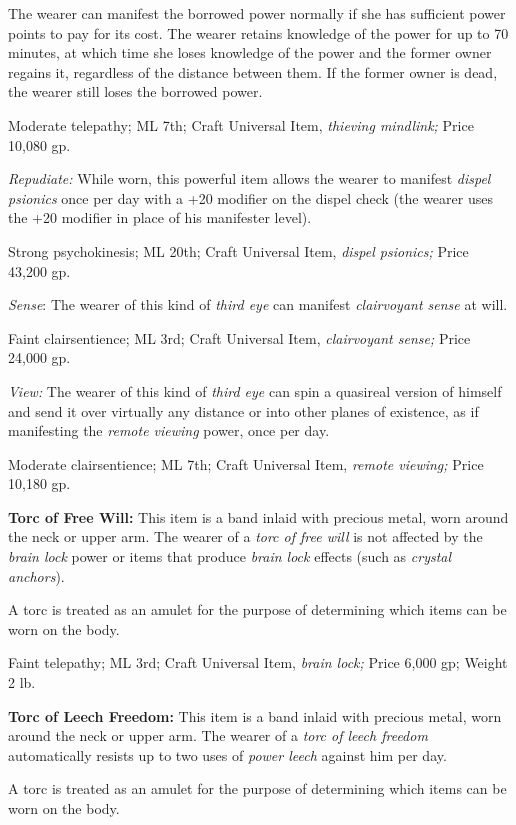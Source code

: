 \documentclass{article}
\begin{document}
The wearer can manifest the borrowed power normally if she has sufficient power 
points to pay for its cost. The wearer retains knowledge of the power for up to 
70 minutes, at which time she loses knowledge of the power and the former owner 
regains it, regardless of the distance between them. If the former owner is dead, 
the wearer still loses the borrowed power.

Moderate telepathy; ML 7th; Craft Universal Item, \textit{thieving mindlink; }Price 
10,080 gp.

\textit{Repudiate: }While worn, this powerful item allows the wearer to manifest 
\textit{dispel psionics }once per day with a +20 modifier on the dispel check (the 
wearer uses the +20 modifier in place of his manifester level).

Strong psychokinesis; ML 20th; Craft Universal Item, \textit{dispel psionics; }Price 
43,200 gp.

\textit{Sense}: The wearer of this kind of \textit{third eye }can manifest \textit{clairvoyant 
sense }at will.

Faint clairsentience; ML 3rd; Craft Universal Item, \textit{clairvoyant sense; 
}Price 24,000 gp.

\textit{View: }The wearer of this kind of \textit{third eye }can spin a quasireal 
version of himself and send it over virtually any distance or into other planes 
of existence, as if manifesting the \textit{remote viewing }power, once per day.

Moderate clairsentience; ML 7th; Craft Universal Item, \textit{remote viewing; 
}Price 10,180 gp.

\textbf{Torc of Free Will:} This item is a band inlaid with precious metal, worn 
around the neck or upper arm. The wearer of a \textit{torc of free will }is not 
affected by the \textit{brain lock }power or items that produce \textit{brain lock 
}effects (such as \textit{crystal anchors}).

A torc is treated as an amulet for the purpose of determining which items can be 
worn on the body.

Faint telepathy; ML 3rd; Craft Universal Item, \textit{brain lock; }Price 6,000 
gp; Weight 2 lb.

\textbf{Torc of Leech Freedom:} This item is a band inlaid with precious metal, 
worn around the neck or upper arm. The wearer of a \textit{torc of leech freedom 
}automatically resists up to two uses of \textit{power leech }against him per day.

A torc is treated as an amulet for the purpose of determining which items can be 
worn on the body.
\end{document}
